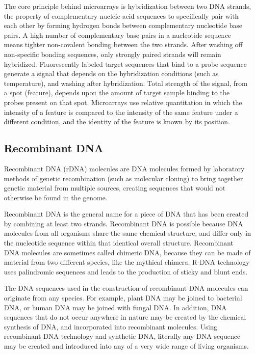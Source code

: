 The core principle behind microarrays is hybridization between two DNA strands, the property of complementary nucleic acid sequences to specifically pair with each other by forming hydrogen bonds between complementary nucleotide base pairs. A high number of complementary base pairs in a nucleotide sequence means tighter non-covalent bonding between the two strands. After washing off non-specific bonding sequences, only strongly paired strands will remain hybridized. Fluorescently labeled target sequences that bind to a probe sequence generate a signal that depends on the hybridization conditions (such as temperature), and washing after hybridization. Total strength of the signal, from a spot (feature), depends upon the amount of target sample binding to the probes present on that spot. Microarrays use relative quantitation in which the intensity of a feature is compared to the intensity of the same feature under a different condition, and the identity of the feature is known by its position.

\hypertarget{recombinant-dna}{%
\subsection{Recombinant DNA}\label{recombinant-dna}}

Recombinant DNA (rDNA) molecules are DNA molecules formed by laboratory methods of genetic recombination (such as molecular cloning) to bring together genetic material from multiple sources, creating sequences that would not otherwise be found in the genome.

Recombinant DNA is the general name for a piece of DNA that has been created by combining at least two strands. Recombinant DNA is possible because DNA molecules from all organisms share the same chemical structure, and differ only in the nucleotide sequence within that identical overall structure. Recombinant DNA molecules are sometimes called chimeric DNA, because they can be made of material from two different species, like the mythical chimera. R-DNA technology uses palindromic sequences and leads to the production of sticky and blunt ends.

The DNA sequences used in the construction of recombinant DNA molecules can originate from any species. For example, plant DNA may be joined to bacterial DNA, or human DNA may be joined with fungal DNA. In addition, DNA sequences that do not occur anywhere in nature may be created by the chemical synthesis of DNA, and incorporated into recombinant molecules. Using recombinant DNA technology and synthetic DNA, literally any DNA sequence may be created and introduced into any of a very wide range of living organisms.

